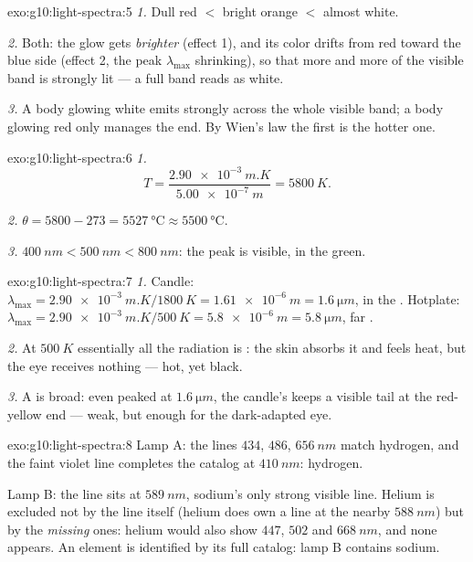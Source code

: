 \begin{solution}{exo:g10:light-spectra:5}
\emph{1.} Dull red $<$ bright orange $<$ almost white.

\emph{2.} Both: the glow gets \emph{brighter} (effect 1), and its color
drifts from red toward the blue side (effect 2, the peak $\lambda_{\max}$
shrinking), so that more and more of the visible band is strongly lit ---
a full band reads as white.

\emph{3.} A body glowing white emits strongly across the whole visible
band; a body glowing red only manages the  end. By Wien's
law the first is the hotter one.
\end{solution}

\begin{solution}{exo:g10:light-spectra:6}
\emph{1.}
\[
T = \frac{\qty{2.90e-3}{m.K}}{\qty{5.00e-7}{m}} = \qty{5800}{K}.
\]

\emph{2.} $\theta = 5800 - 273 = \qty{5527}{\degreeCelsius} \approx
\qty{5500}{\degreeCelsius}$.

\emph{3.} $\qty{400}{nm} < \qty{500}{nm} < \qty{800}{nm}$: the peak is
visible, in the green.
\end{solution}

\begin{solution}{exo:g10:light-spectra:7}
\emph{1.} Candle:
$\lambda_{\max} = \qty{2.90e-3}{m.K} / \qty{1800}{K} = \qty{1.61e-6}{m}
= \qty{1.6}{\micro m}$, in the . Hotplate:
$\lambda_{\max} = \qty{2.90e-3}{m.K} / \qty{500}{K} = \qty{5.8e-6}{m}
= \qty{5.8}{\micro m}$, far .

\emph{2.} At $\qty{500}{K}$ essentially all the radiation is :
the skin absorbs it and feels heat, but the eye receives nothing --- hot,
yet black.

\emph{3.} A  is broad: even peaked at
$\qty{1.6}{\micro m}$, the candle's  keeps a visible tail at the
red-yellow end --- weak, but enough for the dark-adapted eye.
\end{solution}

\begin{solution}{exo:g10:light-spectra:8}
Lamp A: the lines $434$, $486$, $\qty{656}{nm}$ match hydrogen, and the
faint violet line completes the catalog at $\qty{410}{nm}$: hydrogen.

Lamp B: the line sits at $\qty{589}{nm}$, sodium's only strong visible
line. Helium is excluded not by the line itself (helium does own a line
at the nearby $\qty{588}{nm}$) but by the \emph{missing} ones: helium
would also show $447$, $502$ and $\qty{668}{nm}$, and none appears. An
element is identified by its full catalog: lamp B contains sodium.
\end{solution}

